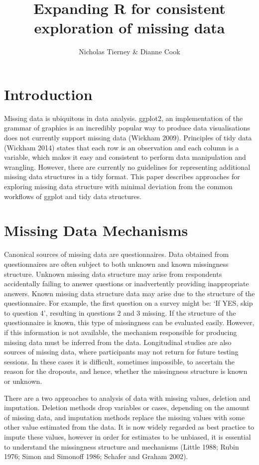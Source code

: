 \documentclass[]{article}
\title{Expanding R for consistent exploration of missing data}
\author{Nicholas Tierney \& Dianne Cook}
\date{}
\begin{document}
\maketitle

\section{Introduction}\label{introduction}

Missing data is ubiquitous in data analysis. ggplot2, an implementation
of the grammar of graphics is an incredibly popular way to produce data
visualisations does not currently support missing data (Wickham 2009).
Principles of tidy data (Wickham 2014) states that each row is an
observation and each column is a variable, which makes it easy and
consistent to perform data manipulation and wrangling. However, there
are currently no guidelines for representing additional missing data
structures in a tidy format. This paper describes approaches for
exploring missing data structure with minimal deviation from the common
workflows of ggplot and tidy data structures.

\section{Missing Data Mechanisms}\label{missing-data-mechanisms}

Canonical sources of missing data are questionnaires. Data obtained from
questionnaires are often subject to both unknown and known missingness
structure. Unknown missing data structure may arise from respondents
accidentally failing to answer questions or inadvertently providing
inappropriate answers. Known missing data structure data may arise due
to the structure of the questionnaire. For example, the first question
on a survey might be: `If YES, skip to question 4', resulting in
questions 2 and 3 missing. If the structure of the questionnaire is
known, this type of missingness can be evaluated easily. However, if
this information is not available, the mechanism responsible for
producing missing data must be inferred from the data. Longitudinal
studies are also sources of missing data, where participants may not
return for future testing sessions. In these cases it is difficult,
sometimes impossible, to ascertain the reason for the dropouts, and
hence, whether the missingness structure is known or unknown.

There are a two approaches to analysis of data with missing values,
deletion and imputation. Deletion methods drop variables or cases,
depending on the amount of missing data, and imputation methods replace
the missing values with some other value estimated from the data. It is
now widely regarded as best practice to impute these values, however in
order for estimates to be unbiased, it is essential to understand the
missingness structure and mechanisms (Little 1988; Rubin 1976; Simon and
Simonoff 1986; Schafer and Graham 2002).
\end{document}
